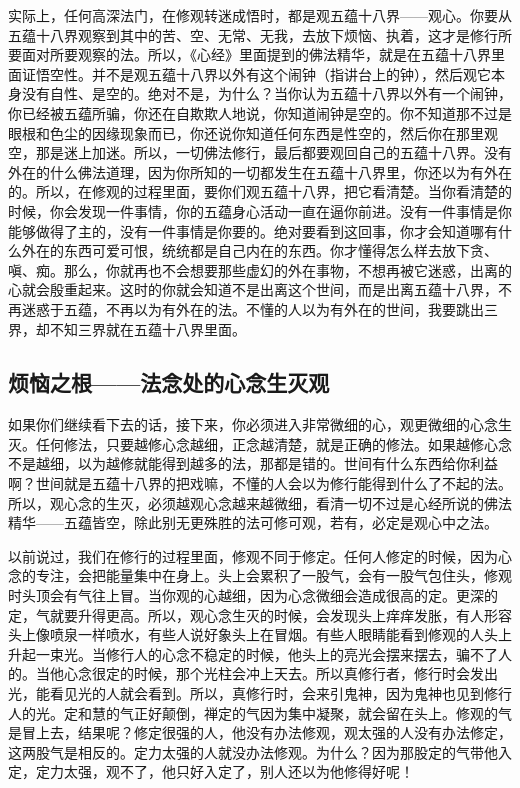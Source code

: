 \documentclass{book}
\begin{document}
实际上，任何高深法门，在修观转迷成悟时，都是观五蕴十八界——观心。你要从五蕴十八界观察到其中的苦、空、无常、无我，去放下烦恼、执着，这才是修行所要面对所要观察的法。所以，《心经》里面提到的佛法精华，就是在五蕴十八界里面证悟空性。并不是观五蕴十八界以外有这个闹钟（指讲台上的钟），然后观它本身没有自性、是空的。绝对不是，为什么？当你认为五蕴十八界以外有一个闹钟，你已经被五蕴所骗，你还在自欺欺人地说，你知道闹钟是空的。你不知道那不过是眼根和色尘的因缘现象而已，你还说你知道任何东西是性空的，然后你在那里观空，那是迷上加迷。所以，一切佛法修行，最后都要观回自己的五蕴十八界。没有外在的什么佛法道理，因为你所知的一切都发生在五蕴十八界里，你还以为有外在的。所以，在修观的过程里面，要你们观五蕴十八界，把它看清楚。当你看清楚的时候，你会发现一件事情，你的五蕴身心活动一直在逼你前进。没有一件事情是你能够做得了主的，没有一件事情是你要的。绝对要看到这回事，你才会知道哪有什么外在的东西可爱可恨，统统都是自己内在的东西。你才懂得怎么样去放下贪、嗔、痴。那么，你就再也不会想要那些虚幻的外在事物，不想再被它迷惑，出离的心就会殷重起来。这时的你就会知道不是出离这个世间，而是出离五蕴十八界，不再迷惑于五蕴，不再以为有外在的法。不懂的人以为有外在的世间，我要跳出三界，却不知三界就在五蕴十八界里面。

\subsection{烦恼之根——法念处的心念生灭观}

如果你们继续看下去的话，接下来，你必须进入非常微细的心，观更微细的心念生灭。任何修法，只要越修心念越细，正念越清楚，就是正确的修法。如果越修心念不是越细，以为越修就能得到越多的法，那都是错的。世间有什么东西给你利益啊？世间就是五蕴十八界的把戏嘛，不懂的人会以为修行能得到什么了不起的法。所以，观心念的生灭，必须越观心念越来越微细，看清一切不过是心经所说的佛法精华——五蕴皆空，除此别无更殊胜的法可修可观，若有，必定是观心中之法。

以前说过，我们在修行的过程里面，修观不同于修定。任何人修定的时候，因为心念的专注，会把能量集中在身上。头上会累积了一股气，会有一股气包住头，修观时头顶会有气往上冒。当你观的心越细，因为心念微细会造成很高的定。更深的定，气就要升得更高。所以，观心念生灭的时候，会发现头上痒痒发胀，有人形容头上像喷泉一样喷水，有些人说好象头上在冒烟。有些人眼睛能看到修观的人头上升起一束光。当修行人的心念不稳定的时候，他头上的亮光会摆来摆去，骗不了人的。当他心念很定的时候，那个光柱会冲上天去。所以真修行者，修行时会发出光，能看见光的人就会看到。所以，真修行时，会来引鬼神，因为鬼神也见到修行人的光。定和慧的气正好颠倒，禅定的气因为集中凝聚，就会留在头上。修观的气是冒上去，结果呢？修定很强的人，他没有办法修观，观太强的人没有办法修定，这两股气是相反的。定力太强的人就没办法修观。为什么？因为那股定的气带他入定，定力太强，观不了，他只好入定了，别人还以为他修得好呢！
\end{document}
